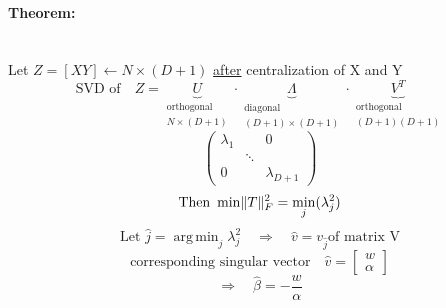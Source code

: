 \documentclass[11pt]{article}
\DeclareMathOperator*{\argmin}{arg\,min}
\DeclarePairedDelimiter\norm{\lVert}{\rVert}
\begin{document}
      \paragraph{Theorem: }\\
      Let $Z=[X Y] \leftarrow N \times (D+1)$ \underline{after} centralization of
      X and Y
      \begin{equation*}
        \text{SVD of} \quad Z = \underbrace{U}_{\substack{\text{orthogonal} \\ N\times (D+1)}}
        \cdot \underbrace{\Lambda}_{\substack{\text{diagonal} \\ (D+1)\times(D+1)}} \cdot
        \underbrace{V^T}_{\substack{\text{orthogonal} \\ (D+1)(D+1)}}
      \end{equation*}
      \begin{equation*}
        \left(
        \begin{array}{ccc}
          \lambda_1 & & 0 \\
          & \ddots & \\
          0 & & \lambda_{D+1}
        \end{array}
        \right)
      \end{equation*}
      \begin{equation*}
        \text{Then } \min \norm{T}_F^2 = \min_j(\lambda_j^2)
      \end{equation*}
      \begin{equation*}
        \text{Let }  \hat{j} = \argmin_j \lambda_j^2 \quad \Rightarrow \quad \hat{v} =
        v_{\hat{j}} \text{of matrix V}
      \end{equation*}
      \begin{equation*}
        \text{corresponding singular vector} \quad \hat{v} = \left[
        \begin{array}{c}
          w \\
          \alpha
        \end{array}
        \right]
      \end{equation*}
      \begin{equation*}
        \Rightarrow \quad \boxed{\hat{\beta} = -\frac{w}{\alpha}}
      \end{equation*}
\end{document}
